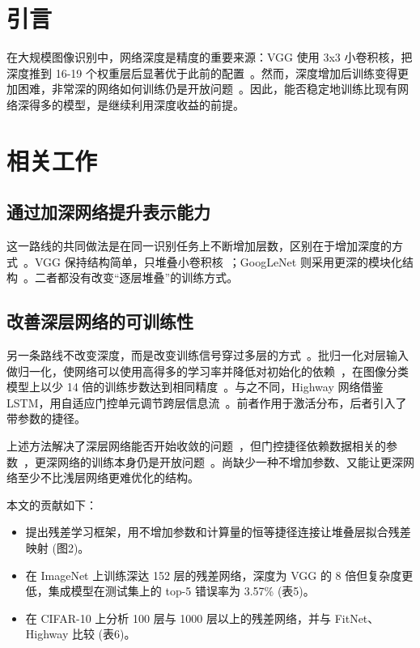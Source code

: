 \section{引言}

在大规模图像识别中，网络深度是精度的重要来源：VGG 使用 3x3 小卷积核，把深度推到 16-19 个权重层后显著优于此前的配置~\cite{simonyan2015}。然而，深度增加后训练变得更加困难，非常深的网络如何训练仍是开放问题~\cite{srivastava2015}。因此，能否稳定地训练比现有网络深得多的模型，是继续利用深度收益的前提。

\section{相关工作}

\subsection{通过加深网络提升表示能力}

这一路线的共同做法是在同一识别任务上不断增加层数，区别在于增加深度的方式~\cite{simonyan2015,szegedy2015}。VGG 保持结构简单，只堆叠小卷积核~\cite{simonyan2015}；GoogLeNet 则采用更深的模块化结构~\cite{szegedy2015}。二者都没有改变“逐层堆叠”的训练方式。

\subsection{改善深层网络的可训练性}

另一条路线不改变深度，而是改变训练信号穿过多层的方式~\cite{ioffe2015,srivastava2015}。批归一化对层输入做归一化，使网络可以使用高得多的学习率并降低对初始化的依赖~\cite{ioffe2015}，在图像分类模型上以少 14 倍的训练步数达到相同精度~\cite{ioffe2015}。与之不同，Highway 网络借鉴 LSTM，用自适应门控单元调节跨层信息流~\cite{srivastava2015}。前者作用于激活分布，后者引入了带参数的捷径。

上述方法解决了深层网络能否开始收敛的问题~\cite{ioffe2015}，但门控捷径依赖数据相关的参数~\cite{srivastava2015}，更深网络的训练本身仍是开放问题~\cite{srivastava2015}。尚缺少一种不增加参数、又能让更深网络至少不比浅层网络更难优化的结构。

本文的贡献如下：

\begin{itemize}
\item 提出残差学习框架，用不增加参数和计算量的恒等捷径连接让堆叠层拟合残差映射 (图2)。
\item 在 ImageNet 上训练深达 152 层的残差网络，深度为 VGG 的 8 倍但复杂度更低，集成模型在测试集上的 top-5 错误率为 3.57\% (表5)。
\item 在 CIFAR-10 上分析 100 层与 1000 层以上的残差网络，并与 FitNet、Highway 比较 (表6)。
\end{itemize}
